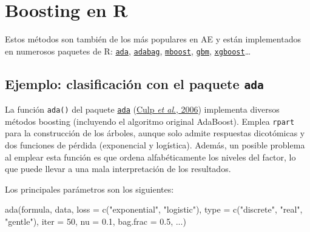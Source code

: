 \documentclass[
]{book}
\newenvironment{Shaded}{\begin{snugshade}}{\end{snugshade}}
\newcommand{\AttributeTok}[1]{\textcolor[rgb]{0.77,0.63,0.00}{#1}}
\newcommand{\DecValTok}[1]{\textcolor[rgb]{0.00,0.00,0.81}{#1}}
\newcommand{\FloatTok}[1]{\textcolor[rgb]{0.00,0.00,0.81}{#1}}
\newcommand{\FunctionTok}[1]{\textcolor[rgb]{0.00,0.00,0.00}{#1}}
\newcommand{\NormalTok}[1]{#1}
\newcommand{\StringTok}[1]{\textcolor[rgb]{0.31,0.60,0.02}{#1}}
\theoremstyle{break}
\theoremstyle{definition}
\theoremstyle{definition}
\theoremstyle{definition}
\theoremstyle{definition}
\theoremstyle{remark}
\begin{document}
\hypertarget{boosting-en-r}{%
\section{Boosting en R}\label{boosting-en-r}}

Estos métodos son también de los más populares en AE y están implementados en numerosos paquetes de R: \href{https://CRAN.R-project.org/package=ada}{\texttt{ada}}, \href{https://CRAN.R-project.org/package=adabag}{\texttt{adabag}}, \href{https://CRAN.R-project.org/package=mboost}{\texttt{mboost}}, \href{https://CRAN.R-project.org/package=gbm}{\texttt{gbm}}, \href{https://github.com/dmlc/xgboost/tree/master/R-package}{\texttt{xgboost}}\ldots{}

\hypertarget{ejemplo-clasificaciuxf3n-con-el-paquete-ada}{%
\subsection{\texorpdfstring{Ejemplo: clasificación con el paquete \texttt{ada}}{Ejemplo: clasificación con el paquete ada}}\label{ejemplo-clasificaciuxf3n-con-el-paquete-ada}}

La función \texttt{ada()} del paquete \href{https://CRAN.R-project.org/package=ada}{\texttt{ada}} (\href{https://www.jstatsoft.org/article/view/v017i02}{Culp \emph{et al}., 2006}) implementa diversos métodos boosting (incluyendo el algoritmo original AdaBoost).
Emplea \texttt{rpart} para la construcción de los árboles, aunque solo admite respuestas dicotómicas y dos funciones de pérdida (exponencial y logística).
Además, un posible problema al emplear esta función es que ordena alfabéticamente los niveles del factor, lo que puede llevar a una mala interpretación de los resultados.

Los principales parámetros son los siguientes:

\begin{Shaded}
\begin{Highlighting}[]
\FunctionTok{ada}\NormalTok{(formula, data, }\AttributeTok{loss =} \FunctionTok{c}\NormalTok{(}\StringTok{"exponential"}\NormalTok{, }\StringTok{"logistic"}\NormalTok{),}
    \AttributeTok{type =} \FunctionTok{c}\NormalTok{(}\StringTok{"discrete"}\NormalTok{, }\StringTok{"real"}\NormalTok{, }\StringTok{"gentle"}\NormalTok{), }\AttributeTok{iter =} \DecValTok{50}\NormalTok{, }
    \AttributeTok{nu =} \FloatTok{0.1}\NormalTok{, }\AttributeTok{bag.frac =} \FloatTok{0.5}\NormalTok{, ...)}
\end{Highlighting}
\end{Shaded}
\end{document}
